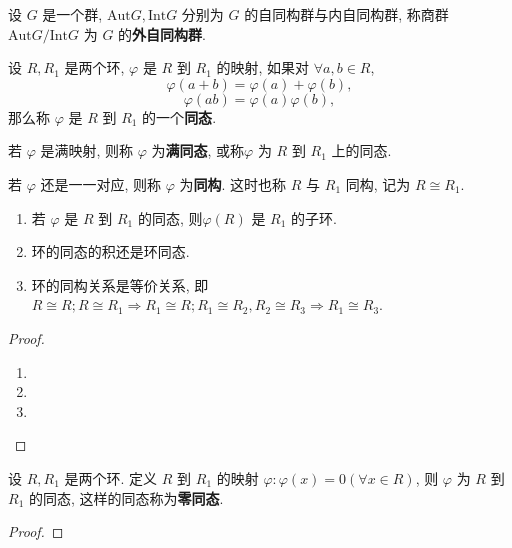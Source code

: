 \documentclass[../../main.tex]{subfiles}
\begin{document}
\begin{definition}
设 \( G \) 是一个群, \( \text{Aut}G, \text{Int}G \) 分别为 \( G \) 的自同构群与内自同构群, 称商群 \( \text{Aut}G/\text{Int}G \) 为 \( G \) 的\textbf{外自同构群}.
\end{definition}

\begin{definition}
设 \( R, R_1 \) 是两个环, \( \varphi \) 是 \( R \) 到 \( R_1 \) 的映射, 如果对 \( \forall a,b \in R \),
\[
\varphi(a + b) = \varphi(a) + \varphi(b),
\]
\[
\varphi(ab) = \varphi(a)\varphi(b),
\]
那么称 \( \varphi \) 是 \( R \) 到 \( R_1 \) 的一个\textbf{同态}.

若 \( \varphi \) 是满映射, 则称 \( \varphi \) 为\textbf{满同态}, 或称\( \varphi \) 为 \( R \) 到 \( R_1 \) 上的同态.

若 \( \varphi \) 还是一一对应, 则称 \( \varphi \) 为\textbf{同构}. 这时也称 \( R \) 与 \( R_1 \) 同构, 记为 \( R \cong R_1 \).
\end{definition}

\begin{proposition}
\begin{enumerate}
\item 若 \( \varphi \) 是 \( R \) 到 \( R_1 \) 的同态, 则\( \varphi(R) \) 是 \( R_1 \) 的子环. 

\item 环的同态的积还是环同态. 

\item 环的同构关系是等价关系, 即 \( R \cong R; R \cong R_1 \Rightarrow R_1 \cong R; R_1 \cong R_2, R_2 \cong R_3 \Rightarrow R_1 \cong R_3 \).
\end{enumerate}
\end{proposition}
\begin{proof}
\begin{enumerate}
\item 

\item 

\item 
\end{enumerate}

\end{proof}

\begin{example}
设 \( R, R_1 \) 是两个环. 定义 \( R \) 到 \( R_1 \) 的映射 \( \varphi: \varphi(x) = 0 (\forall x \in R) \), 则 \( \varphi \) 为 \( R \) 到 \( R_1 \) 的同态, 这样的同态称为\textbf{零同态}.
\end{example}
\begin{proof}


\end{proof}
\end{document}

